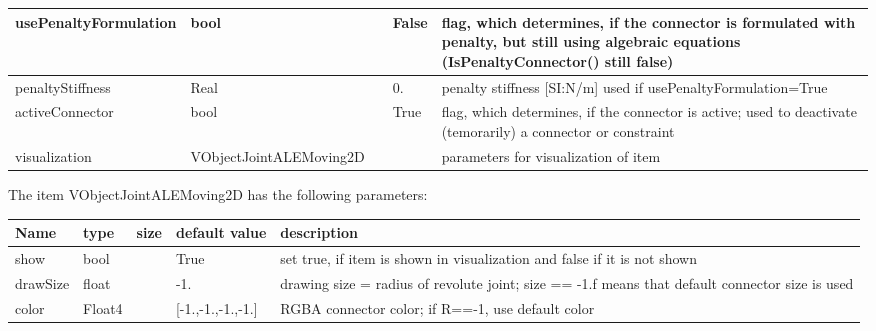 \begin{center}
\begin{longtable}{| p{4.5cm} | p{2.5cm} | p{0.5cm} | p{2.5cm} | p{6cm} |}
    usePenaltyFormulation &     bool &      &     False &     flag, which determines, if the connector is formulated with penalty, but still using algebraic equations (IsPenaltyConnector() still false)\\ \hline
    penaltyStiffness &     Real &      &     0. &     penalty stiffness [SI:N/m] used if usePenaltyFormulation=True\\ \hline
    activeConnector &     bool &      &     True &     flag, which determines, if the connector is active; used to deactivate (temorarily) a connector or constraint\\ \hline
    visualization & VObjectJointALEMoving2D & & & parameters for visualization of item \\ \hline
	  \end{longtable}
	\end{center}
The item VObjectJointALEMoving2D has the following parameters:\vspace{-1cm}\\ 
\begin{center}
  \footnotesize
  \begin{longtable}{| p{4.5cm} | p{2.5cm} | p{0.5cm} | p{2.5cm} | p{6cm} |}
    \hline
    \bf Name & \bf type & \bf size & \bf default value & \bf description \\ \hline
    show &     bool &      &     True &     set true, if item is shown in visualization and false if it is not shown\\ \hline
    drawSize &     float &      &     -1. &     drawing size = radius of revolute joint; size == -1.f means that default connector size is used\\ \hline
    color &     Float4 &      &     [-1.,-1.,-1.,-1.] &     RGBA connector color; if R==-1, use default color\\ \hline
	  \end{longtable}
	\end{center}


